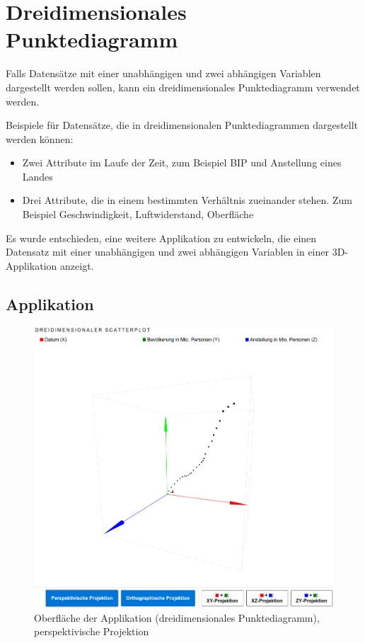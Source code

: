 \newpage
\section{Dreidimensionales Punktediagramm}

Falls Datensätze mit einer unabhängigen und zwei abhängigen Variablen dargestellt werden sollen, kann ein dreidimensionales Punktediagramm verwendet werden.

Beispiele für Datensätze, die in dreidimensionalen Punktediagrammen dargestellt werden können:

\begin{itemize}
	\item Zwei Attribute im Laufe der Zeit, zum Beispiel BIP und Anstellung eines Landes
	\item Drei Attribute, die in einem bestimmten Verhältnis zueinander stehen. Zum Beispiel Geschwindigkeit, Luftwiderstand, Oberfläche
\end{itemize}

Es wurde entschieden, eine weitere Applikation zu entwickeln, die einen Datensatz mit einer unabhängigen und zwei abhängigen Variablen in einer 3D-Applikation anzeigt.

\subsection{Applikation}

\begin{figure}[H]
	\centering
	\includegraphics[width=\linewidth]{images/3d}
	\caption{Oberfläche der Applikation (dreidimensionales Punktediagramm), perspektivische Projektion}
	\label{fig:3d}
\end{figure}

